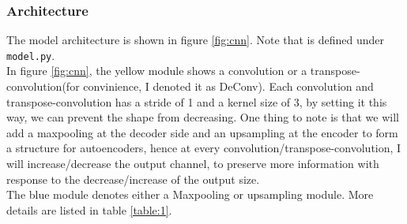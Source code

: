 \documentclass[a4paper, 10]{article}
\begin{document}
        \subsubsection{Architecture} 
            The model architecture is shown in figure \ref{fig:cnn}. Note that is defined
            under \verb|model.py|.\\
            \indent In figure \ref{fig:cnn}, the yellow module shows a convolution or a 
            transpose-convolution(for convinience, I denoted it as DeConv). Each convolution
            and transpose-convolution has a stride of 1 and a kernel size of 3, by setting it
            this way, we can prevent the shape from decreasing. One thing to note is that
            we will add a maxpooling at the decoder side and an upsampling at the encoder
            to form a structure for autoencoders, hence at every convolution/transpose-convolution,
            I will increase/decrease the output channel, to preserve more information
            with response to the decrease/increase of the output size. \\
            \indent The blue module denotes either a Maxpooling or upsampling module.
            More details are listed in table \ref{table:1}.
\end{document}
